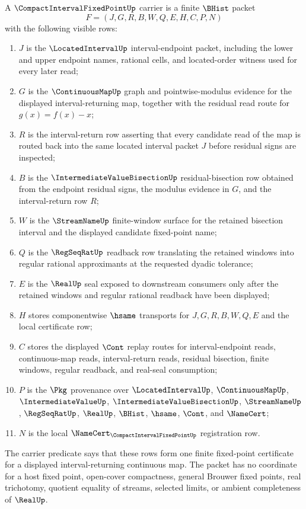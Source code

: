 \begin{definition}
\label{def:compact-interval-fixed-point-carrier}
A $\CompactIntervalFixedPointUp$ carrier is a finite $\BHist$ packet
$$
F=(J,G,R,B,W,Q,E,H,C,P,N)
$$
with the following visible rows:
\begin{enumerate}
\item $J$ is the $\LocatedIntervalUp$ interval-endpoint packet, including the lower and upper endpoint names, rational cells, and located-order witness used for every later read;
\item $G$ is the $\ContinuousMapUp$ graph and pointwise-modulus evidence for the displayed interval-returning map, together with the residual read route for $g(x)=f(x)-x$;
\item $R$ is the interval-return row asserting that every candidate read of the map is routed back into the same located interval packet $J$ before residual signs are inspected;
\item $B$ is the $\IntermediateValueBisectionUp$ residual-bisection row obtained from the endpoint residual signs, the modulus evidence in $G$, and the interval-return row $R$;
\item $W$ is the $\StreamNameUp$ finite-window surface for the retained bisection interval and the displayed candidate fixed-point name;
\item $Q$ is the $\RegSeqRatUp$ readback row translating the retained windows into regular rational approximants at the requested dyadic tolerance;
\item $E$ is the $\RealUp$ seal exposed to downstream consumers only after the retained windows and regular rational readback have been displayed;
\item $H$ stores componentwise $\hsame$ transports for $J,G,R,B,W,Q,E$ and the local certificate row;
\item $C$ stores the displayed $\Cont$ replay routes for interval-endpoint reads, continuous-map reads, interval-return reads, residual bisection, finite windows, regular readback, and real-seal consumption;
\item $P$ is the $\Pkg$ provenance over $\LocatedIntervalUp$, $\ContinuousMapUp$, $\IntermediateValueUp$, $\IntermediateValueBisectionUp$, $\StreamNameUp$, $\RegSeqRatUp$, $\RealUp$, $\BHist$, $\hsame$, $\Cont$, and $\NameCert$;
\item $N$ is the local $\NameCert_{\CompactIntervalFixedPointUp}$ registration row.
\end{enumerate}
The carrier predicate says that these rows form one finite fixed-point certificate for a displayed interval-returning continuous map. The packet has no coordinate for a host fixed point, open-cover compactness, general Brouwer fixed points, real trichotomy, quotient equality of streams, selected limits, or ambient completeness of $\RealUp$.
\end{definition}

